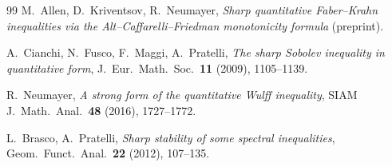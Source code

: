 \documentclass[11pt]{article}
\theoremstyle{definition}
\begin{document}
\begin{thebibliography}{99}
 M.~Allen, D.~Kriventsov, R.~Neumayer,
\emph{Sharp quantitative Faber--Krahn inequalities via the
Alt--Caffarelli--Friedman monotonicity formula} (preprint).

 A.~Cianchi, N.~Fusco, F.~Maggi, A.~Pratelli,
\emph{The sharp Sobolev inequality in quantitative form},
J.\ Eur.\ Math.\ Soc.\ \textbf{11} (2009), 1105--1139.

 R.~Neumayer,
\emph{A strong form of the quantitative Wulff inequality},
SIAM J.\ Math.\ Anal.\ \textbf{48} (2016), 1727--1772.

 L.~Brasco, A.~Pratelli,
\emph{Sharp stability of some spectral inequalities},
Geom.\ Funct.\ Anal.\ \textbf{22} (2012), 107--135.

\end{thebibliography}
\end{document}
